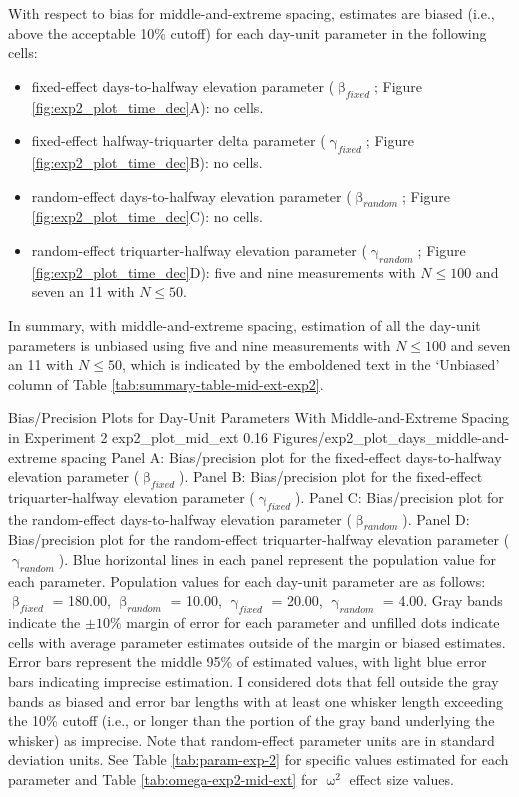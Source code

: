 \documentclass[
12pt, %
twoside,
english]{guelphthesis}
\begin{document}
With respect to bias for middle-and-extreme spacing, estimates are biased (i.e., above the acceptable 10\% cutoff) for each day-unit parameter in the following cells:
\begin{itemize}
\tightlist
\item
  fixed-effect days-to-halfway elevation parameter (\(\upbeta_{fixed}\); Figure \ref{fig:exp2_plot_time_dec}A): no cells.
\item
  fixed-effect halfway-triquarter delta parameter (\(\upgamma_{fixed}\); Figure \ref{fig:exp2_plot_time_dec}B): no cells.
\item
  random-effect days-to-halfway elevation parameter (\(\upbeta_{random}\); Figure \ref{fig:exp2_plot_time_dec}C): no cells.\\
\item
  random-effect triquarter-halfway elevation parameter (\(\upgamma_{random}\); Figure \ref{fig:exp2_plot_time_dec}D): five and nine measurements with \(N \le 100\) and seven an 11 with \(N \le 50\).
\end{itemize}
In summary, with middle-and-extreme spacing, estimation of all the day-unit parameters is unbiased using five and nine measurements with \(N \le 100\) and seven an 11 with \(N \le 50\), which is indicated by the emboldened text in the `Unbiased' column of Table \ref{tab:summary-table-mid-ext-exp2}.
\begin{apaFigure}
[portrait]
[samepage]
[-0.2cm]
{Bias/Precision Plots for Day-Unit Parameters With Middle-and-Extreme Spacing in Experiment 2}
{exp2_plot_mid_ext}
{0.16}
{Figures/exp2_plot_days_middle-and-extreme spacing}
{Panel A: Bias/precision plot for the fixed-effect days-to-halfway elevation parameter ($\upbeta_{fixed}$). Panel B: Bias/precision plot for the fixed-effect triquarter-halfway elevation parameter ($\upgamma_{fixed}$). Panel C: Bias/precision plot for the random-effect days-to-halfway elevation parameter ($\upbeta_{random}$). Panel D: Bias/precision plot for the random-effect triquarter-halfway elevation parameter ($\upgamma_{random}$). Blue horizontal lines in each panel represent the population value for each parameter. Population values for each day-unit parameter are as follows: $\upbeta_{fixed}$ = 180.00, $\upbeta_{random}$ = 10.00, $\upgamma_{fixed}$ = 20.00, $\upgamma_{random}$ = 4.00. Gray bands indicate the $\pm 10\%$ margin of error for each parameter and unfilled dots indicate cells with average parameter estimates outside of the margin or biased estimates. Error bars represent the middle 95\% of estimated values, with light blue error bars indicating imprecise estimation. I considered dots that fell outside the gray bands as biased and error bar lengths with at least one whisker length exceeding the 10\% cutoff (i.e., or longer than the portion of the gray band underlying the whisker) as imprecise. Note that random-effect parameter units are in standard deviation units. See Table \ref{tab:param-exp-2} for specific values estimated for each parameter and Table \ref{tab:omega-exp2-mid-ext} for $\upomega^2$ effect size values.}
\end{apaFigure}
\end{document}
